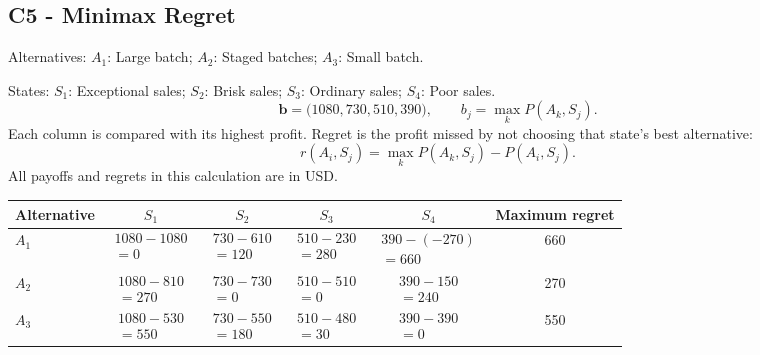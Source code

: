 \subsection*{C5 - Minimax Regret }
\label{sol:juice-production-c5}
Alternatives: $A_1$: Large batch; $A_2$: Staged batches; $A_3$: Small batch.\par
States: $S_1$: Exceptional sales; $S_2$: Brisk sales; $S_3$: Ordinary sales; $S_4$: Poor sales.
\[\boldsymbol{b}=\bigl(1080,730,510,390\bigr),\qquad b_j=\max_k P(A_k,S_j).\]
Each column is compared with its highest profit. Regret is the profit missed by not choosing that state's best alternative:
\[r(A_i,S_j)=\max_k P(A_k,S_j)-P(A_i,S_j).\]
All payoffs and regrets in this calculation are in USD.
\begin{center}
\begin{tabular}{@{}lccccc@{}}\toprule
Alternative & $S_1$ & $S_2$ & $S_3$ & $S_4$ & Maximum regret\\\midrule
$A_1$ & $\begin{gathered}1080-1080\\=0\end{gathered}$ & $\begin{gathered}730-610\\=120\end{gathered}$ & $\begin{gathered}510-230\\=280\end{gathered}$ & $\begin{gathered}390-(-270)\\=660\end{gathered}$ & 660\\
$A_2$ & $\begin{gathered}1080-810\\=270\end{gathered}$ & $\begin{gathered}730-730\\=0\end{gathered}$ & $\begin{gathered}510-510\\=0\end{gathered}$ & $\begin{gathered}390-150\\=240\end{gathered}$ & 270\\
$A_3$ & $\begin{gathered}1080-530\\=550\end{gathered}$ & $\begin{gathered}730-550\\=180\end{gathered}$ & $\begin{gathered}510-480\\=30\end{gathered}$ & $\begin{gathered}390-390\\=0\end{gathered}$ & 550\\
\bottomrule\end{tabular}
\end{center}
